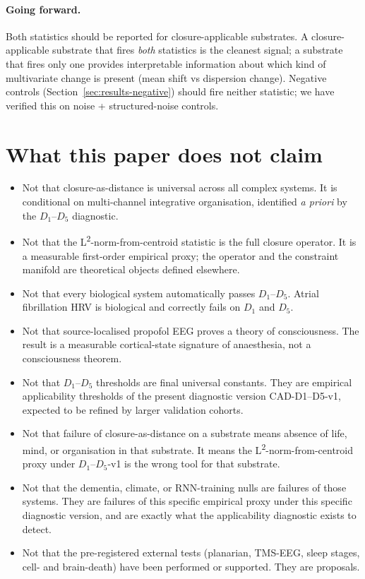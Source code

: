\documentclass[11pt,a4paper]{article}
\begin{document}
\paragraph{Going forward.} Both statistics should be reported for closure-applicable substrates. A closure-applicable substrate that fires \emph{both} statistics is the cleanest signal; a substrate that fires only one provides interpretable information about which kind of multivariate change is present (mean shift vs dispersion change). Negative controls (Section~\ref{sec:results-negative}) should fire neither statistic; we have verified this on noise + structured-noise controls.

\section{What this paper does not claim}\label{sec:nonclaims}

\begin{itemize}\itemsep0pt
\item Not that closure-as-distance is universal across all complex systems. It is conditional on multi-channel integrative organisation, identified \emph{a priori} by the $D_1$--$D_5$ diagnostic.
\item Not that the L\textsuperscript{2}-norm-from-centroid statistic is the full closure operator. It is a measurable first-order empirical proxy; the operator and the constraint manifold are theoretical objects defined elsewhere.
\item Not that every biological system automatically passes $D_1$--$D_5$. Atrial fibrillation HRV is biological and correctly fails on $D_1$ and $D_5$.
\item Not that source-localised propofol EEG proves a theory of consciousness. The result is a measurable cortical-state signature of anaesthesia, not a consciousness theorem.
\item Not that $D_1$--$D_5$ thresholds are final universal constants. They are empirical applicability thresholds of the present diagnostic version CAD-D1--D5-v1, expected to be refined by larger validation cohorts.
\item Not that failure of closure-as-distance on a substrate means absence of life, mind, or organisation in that substrate. It means the L\textsuperscript{2}-norm-from-centroid proxy under $D_1$--$D_5$-v1 is the wrong tool for that substrate.
\item Not that the dementia, climate, or RNN-training nulls are failures of those systems. They are failures of this specific empirical proxy under this specific diagnostic version, and are exactly what the applicability diagnostic exists to detect.
\item Not that the pre-registered external tests (planarian, TMS-EEG, sleep stages, cell- and brain-death) have been performed or supported. They are proposals.
\end{itemize}
\end{document}
